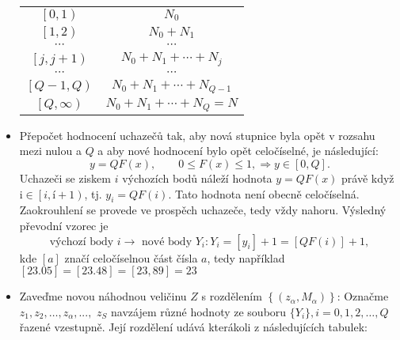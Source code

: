 \begin{example}
\begin{itemize}
\begin{table}[ht!]
{\begin{tabular}{c|c}
                \(\left[0,1\right)\)       &  \(N_0\)           \\ 
                \(\left[1,2\right)\)       &  \(N_0 + N_1\)     \\ 
                \(\cdots\)                 &  \(\cdots\)        \\
                \(\left[j,j+1\right)\)     &  \(N_0 + N_1 + \cdots + N_j\)           \\ 
                \(\cdots\)                 &  \(\cdots\)                             \\
                \(\left[Q-1,Q\right)\)     &  \(N_0 + N_1 + \cdots + N_{Q-1}\)       \\ 
                \(\left[Q,\infty\right)\)  &  \(N_0 + N_1 + \cdots + N_{Q} = N\)     \\ 
              \end{tabular}}
            \end{table}
      \item Přepočet hodnocení uchazečů tak, aby nová stupnice byla opět v rozsahu mezi nulou a 
            \(Q\) a aby nové hodnocení bylo opět celočíselné, je následující:
            \begin{equation*}
              y =QF(x), \qquad 0\leq F(x) \leq 1, \Rightarrow y \in[0,Q].
            \end{equation*}
            Uchazeči se ziskem \(i\) výchozích bodů náleží hodnota \(y = QF(x)\) právě když i\( \in 
            \left[i, í + 1\right)\), tj. \(y_i = Q F(i)\). Tato hodnota není obecně celočíselná. 
            Zaokrouhlení se provede ve prospěch uchazeče, tedy vždy nahoru. Výsledný převodní 
            vzorec je
            \begin{equation*}
              \text{výchozí body } i \longrightarrow\text{ nové body } Y_i: Y_i = [y_i] + 1 = 
              [QF(i)] + 1,
            \end{equation*}
            kde \([a]\) značí celočíselnou část čísla \(a\), tedy například \([\num{23.05}] = 
            [\num{23.48}] = [23,89] = 23\)
      \item Zaveďme novou náhodnou veličinu \(Z\) s rozdělením \(\left\lbrace(z_\alpha, 
            M_\alpha)\right\rbrace\): Označme \(z_1, z_2, \ldots, z_\alpha, ...,\) \(z_S\) navzájem
            různé hodnoty ze souboru \(\lbrace Y_i\rbrace, i = 0, 1, 2, \ldots, Q\) řazené 
            vzestupně. Její rozdělení udává kterákoli z následujících tabulek:
            \begin{table}[ht!]

\end{table}
\end{itemize}
\end{example}
